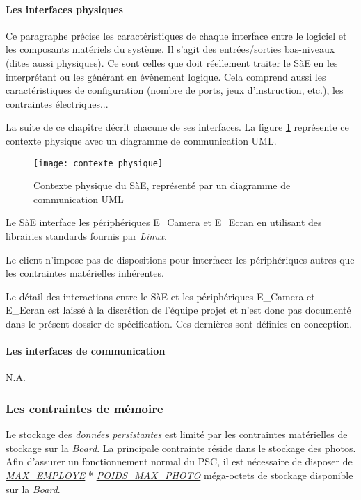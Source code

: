 \newpage

\paragraph{Les interfaces physiques}
\label{2.2.2.3}

Ce paragraphe précise les caractéristiques de chaque interface entre le logiciel et les composants matériels du système. 
Il s’agit des entrées/sorties bas-niveaux (dites aussi physiques).
Ce sont celles que doit réellement traiter le SàE en les interprétant ou les générant en évènement logique. 
Cela comprend aussi les caractéristiques de configuration (nombre de ports, jeux d’instruction, etc.), les contraintes électriques... 

La suite de ce chapitre décrit chacune de ses interfaces. 
La figure \ref{ContextePhysique} représente ce contexte physique avec un diagramme de communication UML.

\begin{figure} [H]
    \centering
    \texttt{[image: contexte\_physique]}
    \caption{Contexte physique du SàE, représenté par un diagramme de communication UML}
    \label{ContextePhysique}
\end{figure}

Le SàE interface les périphériques E\_Camera et E\_Ecran en utilisant des librairies standards fournis par \hyperlink{linux}{\textit{Linux}}.

Le client n'impose pas de dispositions pour interfacer les périphériques autres que les contraintes matérielles inhérentes.

Le détail des interactions entre le SàE et les périphériques E\_Camera et E\_Ecran est laissé à la discrétion de l'équipe projet et n'est donc pas documenté dans le présent dossier de spécification. Ces dernières sont définies en conception.


\newpage

\paragraph{Les interfaces de communication}
N.A.

\subsubsection{Les contraintes de mémoire}
Le stockage des \hyperlink{donneesPersistantes}{\textit{données persistantes}} est limité par les contraintes matérielles de stockage sur la \hyperlink{bd}{\textit{Board}}.
La principale contrainte réside dans le stockage des photos.
Afin d'assurer un fonctionnement normal du PSC, il est nécessaire de disposer de \hyperlink{maxEmployee}{\textit{MAX\_EMPLOYE}} * \hyperlink{poidsPhoto}{\textit{POIDS\_MAX\_PHOTO}} méga-octets de stockage disponible sur la \hyperlink{bd}{\textit{Board}}.

